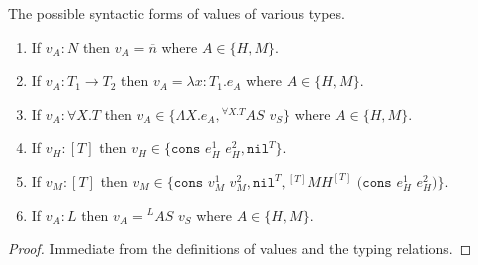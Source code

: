 \begin{lemma}
\label{cf}
The possible syntactic forms of values of various types.
\begin{enumerate}
\item If $v_{A}:N$ then $v_{A}=\overline{n}$ where $A\in\lbrace H,M\rbrace$.
\item If $v_{A}:T_{1}\rightarrow T_{2}$ then $v_{A}=\lambda x:T_{1}.e_{A}$ where $A\in\lbrace H,M\rbrace$.
\item If $v_{A}:\forall X.T$ then $v_{A}\in\lbrace\Lambda X.e_{A},{^{\forall X.T}A}S$ $v_{S}\rbrace$ where $A\in\lbrace H,M\rbrace$.
\item If $v_{H}:[T]$ then $v_{H}\in\lbrace\mathtt{cons}$ $e_{H}^{1}$ $e_{H}^{2},\mathtt{nil}^{T}\rbrace$.
\item If $v_{M}:[T]$ then $v_{M}\in\lbrace\mathtt{cons}$ $v_{M}^{1}$ $v_{M}^{2},\mathtt{nil}^{T},{^{[T]}M}H^{[T]}$ $(\mathtt{cons}$ $e_{H}^{1}$ $e_{H}^{2})\rbrace$.
\item If $v_{A}:L$ then $v_{A}={^{L}A}S$ $v_{S}$ where $A\in\lbrace H,M\rbrace$.
\end{enumerate}
\begin{proof}
Immediate from the definitions of values and the typing relations.
\end{proof}
\end{lemma}